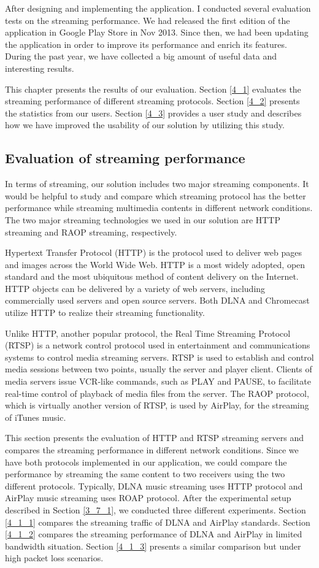 
After designing and implementing the application. I conducted several
evaluation tests on the streaming performance. We had released the first
edition of the application in Google Play Store in Nov 2013. Since then, we had
been updating the application in order to improve its performance and enrich
its features. During the past year, we have collected a big amount of
useful data and interesting results.

This chapter presents the results of our evaluation. Section \ref{4_1} evaluates
the streaming performance of different streaming protocols. Section \ref{4_2}
presents the statistics from our users. Section \ref{4_3} provides a user study
and describes how we have improved the usability of our solution by utilizing
this study.
\subsection{Evaluation of streaming performance\label{4_1}}
In terms of streaming, our solution includes two major streaming components. It
would be helpful to study and compare which streaming protocol has the better
performance while streaming multimedia contents in different network conditions.
The two major streaming technologies we used in our solution are HTTP streaming
and RAOP streaming, respectively.

Hypertext Transfer Protocol (HTTP) is the protocol used to deliver web pages
and images across the World Wide Web. HTTP is a most widely adopted, open
standard and the most ubiquitous method of content delivery on the Internet.
HTTP objects can be delivered by a variety of web servers, including
commercially used servers and open source servers. Both DLNA and Chromecast utilize
HTTP to realize their streaming functionality.

Unlike HTTP, another popular protocol, the Real Time Streaming Protocol (RTSP)
is a network control protocol used in entertainment and communications systems
to control media streaming servers. RTSP is used to establish and control media
sessions between two points, usually the server and player client. Clients of
media servers issue VCR-like commands, such as PLAY and PAUSE, to facilitate
real-time control of playback of media files from the server.  The RAOP
protocol, which is virtually another version of RTSP, is used by AirPlay, for
the streaming of iTunes music.

This section presents the evaluation of HTTP and RTSP streaming servers and
compares the streaming performance in different network conditions. Since we
have both protocols implemented in our application, we could compare the
performance by streaming the same content to two receivers using the two
different protocols. Typically, DLNA music streaming uses HTTP protocol and
AirPlay music streaming uses ROAP protocol. After the experimental setup
described in Section \ref{3_7_1}, we conducted three different experiments.
Section \ref{4_1_1} compares the streaming traffic of DLNA and AirPlay
standards. Section \ref{4_1_2} compares the streaming performance of DLNA and
AirPlay in limited bandwidth situation. Section \ref{4_1_3} presents a
similar comparison but under high packet loss scenarios.
